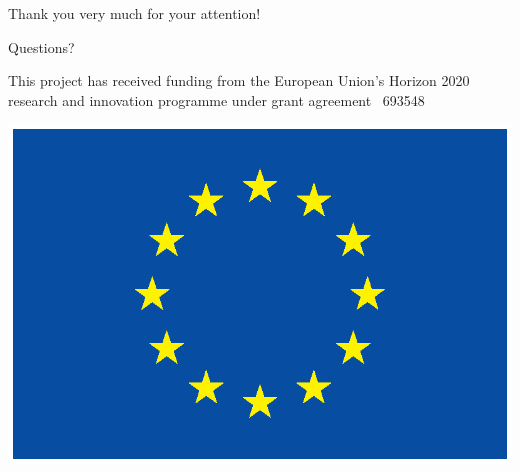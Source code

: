 \documentclass[xcolor=x11names, aspectratio=169,usenames,dvipsnames]{beamer}
\begin{document}
\begin{frame}[plain]
\vfill\vfill\vfill
\begin{center}\Large
Thank you very much for your attention!\\\bigskip

Questions?
\end{center}\vfill\vfill

\hfill
\begin{minipage}{0.7\textwidth}\scriptsize
\begin{flushright}
This project has received funding from the European Union's Horizon 2020 research and innovation programme under grant agreement \textnumero\ 693548
\end{flushright}
\end{minipage}\hspace*{1em}
\begin{minipage}{0.1\textwidth}
\includegraphics[width=\textwidth]{img/eu_flag.ps}
\end{minipage}
\end{frame}

\maketitle
\end{document}
